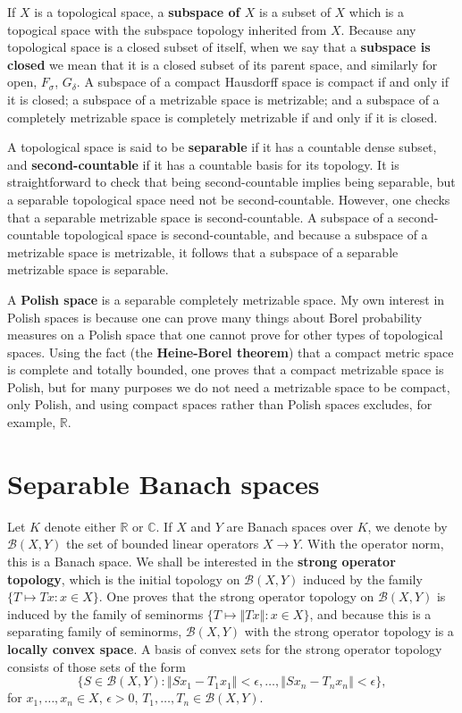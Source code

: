 \documentclass{article}
\newcommand{\norm}[1]{\left\Vert #1 \right\Vert}
\theoremstyle{definition}
\theoremstyle{definition}
\begin{document}
If $X$ is a topological space, a \textbf{subspace of $X$} is a subset of $X$ which is a topogical space with the subspace topology inherited from $X$. 
Because any topological space is a closed subset of itself, when we say that a \textbf{subspace is closed} we mean that 
it is a closed subset of its parent space, and similarly for open, $F_\sigma$, $G_\delta$.
A subspace of a compact Hausdorff space is compact if and only if it is closed;
a subspace of a metrizable space is metrizable; and a subspace of a completely metrizable space is completely metrizable if and only if it is closed.

A topological space is said to be \textbf{separable} if it has a countable dense subset, and \textbf{second-countable} if it has a countable basis for its topology.
It is straightforward to check that being second-countable implies being separable, but a separable topological space need not be second-countable. However, one checks
that a separable metrizable space is  second-countable. 
A subspace of a second-countable topological space is second-countable, and because a subspace of a metrizable space is metrizable, it follows that a subspace
of a separable metrizable space is separable.

A \textbf{Polish space} is a separable completely metrizable space. My own interest in Polish spaces is because one can prove many things about Borel
probability measures on a Polish space that one cannot prove for other types of topological spaces. Using the fact (the \textbf{Heine-Borel theorem}) that a compact
metric space is complete and totally bounded, one proves that a compact metrizable space is Polish, but for many
purposes we do not need  a metrizable space to be compact, only Polish, and using compact spaces rather than Polish spaces
excludes, for example, $\mathbb{R}$. 


\section{Separable Banach spaces}
Let $K$ denote either $\mathbb{R}$ or $\mathbb{C}$. 
If $X$ and $Y$ are Banach spaces over $K$, we denote by $\mathscr{B}(X,Y)$ the set of bounded linear operators $X \to Y$. With the operator norm, 
this is a Banach space.
We shall be interested in the \textbf{strong operator topology}, which is the initial topology on
$\mathscr{B}(X,Y)$ induced by the family $\{T \mapsto Tx: x \in X\}$. 
One proves that the strong operator topology on $\mathscr{B}(X,Y)$ is induced by the family of
seminorms $\{T \mapsto \norm{Tx}: x \in X\}$, and because this is a separating family of seminorms, $\mathscr{B}(X,Y)$ with the strong operator topology is
a \textbf{locally convex space}. 
A basis of convex sets for the strong operator topology consists of those sets of the form
\[
\{S \in \mathscr{B}(X,Y): \norm{Sx_1-T_1x_1}<\epsilon,\ldots,\norm{Sx_n-T_nx_n}<\epsilon\},
\]
for $x_1,\ldots,x_n \in X$, $\epsilon>0$, $T_1,\ldots,T_n \in \mathscr{B}(X,Y)$. 
 
\end{document}
